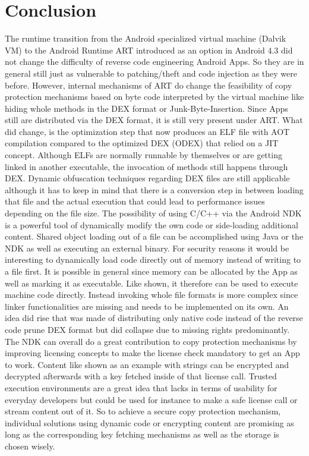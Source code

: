 \chapter{Conclusion}\label{chapter:conclusion}
The runtime transition from the Android specialized virtual machine (Dalvik VM)
to the Android Runtime ART introduced as an option in Android 4.3 did not change the difficulty of reverse code engineering Android Apps. So they are in general still just as vulnerable to patching/theft and code injection as they were before.
However, internal mechanisms of ART do change the feasibility of copy protection
mechanisms based on byte code interpreted by the virtual machine like hiding
whole methods in the DEX format or Junk-Byte-Insertion. 
Since Apps still are distributed via the DEX
format, it is still very present under ART. What did change, is the optimization
step that now produces an ELF file with AOT compilation compared to the optimized
DEX (ODEX) that relied on a JIT concept. Although ELFs are normally runnable by 
themselves or are getting linked in another executable, the invocation of methods still happens through DEX. 
Dynamic obfuscation techniques regarding DEX files are still applicable although
it has to keep in mind that there is a conversion step in between loading that 
file and the actual execution that could lead to performance issues depending 
on the file size. The possibility of using C/C++ via the Android NDK is a 
powerful tool of dynamically modify the own code or side-loading additional
content. Shared object loading out of a file can be accomplished using Java or 
the NDK as well as executing an external binary. For security reasons it
would be interesting to dynamically load code directly out of memory instead
of writing to a file first. It is possible in general since memory can be allocated by the App as well as marking it as executable. Like shown, it
therefore can be used to execute machine code directly. Instead invoking 
whole file formats is more complex since linker functionalities are missing
and needs to be implemented on its own. An idea did rise that was made of 
distributing only native code instead of the reverse code prune DEX format
but did collapse due to missing rights predominantly. 
The NDK can overall do a great contribution to copy protection mechanisms
by improving licensing concepts to make the license check mandatory to get 
an App to work. Content like shown as an example with strings can be 
encrypted and decrypted afterwards with a key fetched inside of that
license call. Trusted execution environments are a great idea that lacks 
in terms of usability for everyday developers but could be used for instance
to make a safe license call or stream content out of it.
So to achieve a secure copy protection mechanism, individual solutions
using dynamic code or encrypting content are promising as long as the 
corresponding key fetching mechanisms as well as the storage is chosen wisely.

